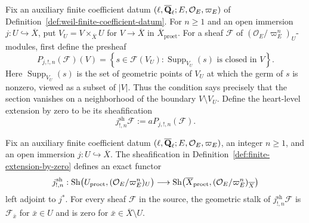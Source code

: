 \begin{definition}
\label{def:finite-extension-by-zero}


Fix an auxiliary finite coefficient datum
\((\ell,\overline{\mathbf Q}_\ell;E,\mathcal O_E,\varpi_E)\) of
Definition~\ref{def:weil-finite-coefficient-datum}.
For \(n\geq1\) and an open immersion
\(j:U\hookrightarrow\overline X\), put
\(V_U=V\times_{\overline X}U\) for
\(V\to\overline X\) in \(\overline X_{\mathrm{proet}}\).  For a sheaf
\(\mathcal F\) of \((\mathcal O_E/\varpi_E^n)_U\)-modules, first define the
presheaf
\[
 P_{j,!,n}(\mathcal F)(V)=
 \left\{s\in\mathcal F(V_U):
   \operatorname{Supp}_{V_U}(s)\text{ is closed in }V\right\}.
\]
Here \(\operatorname{Supp}_{V_U}(s)\) is the set of geometric points of
\(V_U\) at which the germ of \(s\) is nonzero, viewed as a subset of
\(|V|\).  Thus the condition says precisely that the section vanishes on a
neighborhood of the boundary \(V\setminus V_U\).  Define the heart-level
extension by zero to be its sheafification
\[
 j^{\mathrm{sh}}_{!,n}\mathcal F:=aP_{j,!,n}(\mathcal F).
\]
\end{definition}


\begin{proposition}
\label{prop:finite-extension-by-zero-properties}


Fix an auxiliary finite coefficient datum
\((\ell,\overline{\mathbf Q}_\ell;E,\mathcal O_E,\varpi_E)\), an integer \(n\geq1\), and an
open immersion \(j:U\hookrightarrow\overline X\).
The sheafification in Definition~\ref{def:finite-extension-by-zero} defines
an exact
functor
\[
 j^{\mathrm{sh}}_{!,n}: \operatorname{Sh}\bigl(U_{\mathrm{proet}},(\mathcal O_E/\varpi_E^n)_U\bigr)
 \longrightarrow
 \operatorname{Sh}\bigl(\overline X_{\mathrm{proet}},
            (\mathcal O_E/\varpi_E^n)_{\overline X}\bigr)
\]
left adjoint to \(j^*\).  For every sheaf \(\mathcal F\) in the source,
the geometric stalk of \(j^{\mathrm{sh}}_{!,n}\mathcal F\) is
\(\mathcal F_{\bar x}\) for \(\bar x\in U\) and is zero for
\(\bar x\in\overline X\setminus U\).
\end{proposition}


